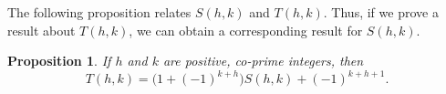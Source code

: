 \documentclass[11pt,reqno]{amsart}
\renewcommand{\pmod}[1]{\,(\textup{mod}\,#1)}
\theoremstyle{plain}
\numberwithin{equation}{section}
\newtheorem{proposition}[theorem]{Proposition}
\begin{document}

The following proposition relates $S(h,k)$ and $T(h,k)$.  Thus, if we prove a result about $T(h,k)$, we can obtain a corresponding result for $S(h,k)$.

\begin{proposition}\label{hkhk}  If $h$ and $k$ are positive, co-prime integers, then
\begin{equation*}
T(h,k) = \bigl(1+(-1)^{k+h}\bigr) S(h,k) + (-1)^{k+h+1}.
\end{equation*}
\end{proposition}
\end{document}
